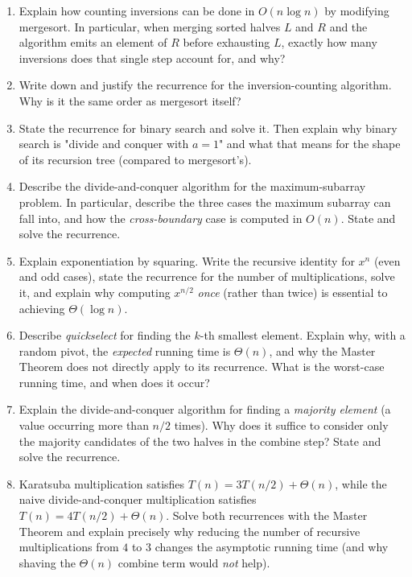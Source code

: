 \documentclass[11pt]{article}
\begin{document}
\begin{enumerate}[label=\textbf{A\arabic*.}, leftmargin=2.2em]
\item Explain how counting inversions can be done in $O(n \log n)$ by modifying mergesort.
In particular, when merging sorted halves $L$ and $R$ and the algorithm emits an element of
$R$ before exhausting $L$, exactly how many inversions does that single step account for,
and why?

\item Write down and justify the recurrence for the inversion-counting algorithm. Why is it
the same order as mergesort itself?

\item State the recurrence for binary search and solve it. Then explain why binary search
is "divide and conquer with $a = 1$" and what that means for the shape of its recursion
tree (compared to mergesort's).

\item Describe the divide-and-conquer algorithm for the maximum-subarray problem. In
particular, describe the three cases the maximum subarray can fall into, and how the
\emph{cross-boundary} case is computed in $O(n)$. State and solve the recurrence.

\item Explain exponentiation by squaring. Write the recursive identity for $x^n$ (even and
odd cases), state the recurrence for the number of multiplications, solve it, and explain
why computing $x^{n/2}$ \emph{once} (rather than twice) is essential to achieving
$\Theta(\log n)$.

\item Describe \emph{quickselect} for finding the $k$-th smallest element. Explain why, with
a random pivot, the \emph{expected} running time is $\Theta(n)$, and why the Master Theorem
does not directly apply to its recurrence. What is the worst-case running time, and when
does it occur?

\item Explain the divide-and-conquer algorithm for finding a \emph{majority element} (a
value occurring more than $n/2$ times). Why does it suffice to consider only the majority
candidates of the two halves in the combine step? State and solve the recurrence.

\item Karatsuba multiplication satisfies $T(n) = 3T(n/2) + \Theta(n)$, while the naive
divide-and-conquer multiplication satisfies $T(n) = 4T(n/2) + \Theta(n)$. Solve both
recurrences with the Master Theorem and explain precisely why reducing the number of
recursive multiplications from $4$ to $3$ changes the asymptotic running time (and why
shaving the $\Theta(n)$ combine term would \emph{not} help).

\end{enumerate}
\end{document}
